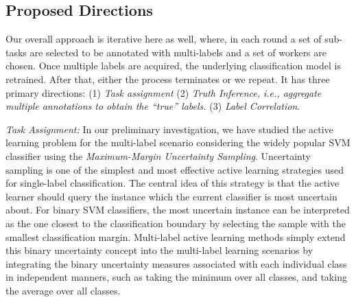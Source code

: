
\vspace{-0.1in}
\subsection{Proposed Directions}
\vspace{-0.1in}
Our overall approach is iterative here as well, where, in each round a set of sub-tasks are selected to be annotated with multi-labels and a set of workers are chosen. Once multiple labels are acquired, the underlying classification model is retrained. After that, either the process terminates or we repeat. It has three primary directions: (1) {\em Task assignment} (2) {\em  Truth Inference, i.e.,  aggregate multiple annotations to obtain the ``true'' labels.} (3) {\em Label Correlation}.

{\em Task Assignment:} In our preliminary investigation, we have studied the active learning problem for the multi-label scenario considering the widely popular SVM classifier using the {\em Maximum-Margin Uncertainty Sampling}. Uncertainty sampling \cite{al1} is one of the simplest and most effective active learning strategies used for single-label classification. The central idea of this strategy is that the active learner should query the instance which the current classifier is most uncertain about. For binary SVM classifiers, the most uncertain instance can be interpreted as the one closest to the classification boundary by selecting the sample with the smallest classification margin. Multi-label active learning methods simply extend this binary uncertainty concept into the multi-label learning scenarios by integrating the binary
uncertainty measures associated with each individual class in independent manners, such as taking the minimum over all classes, and taking the average over all classes.

